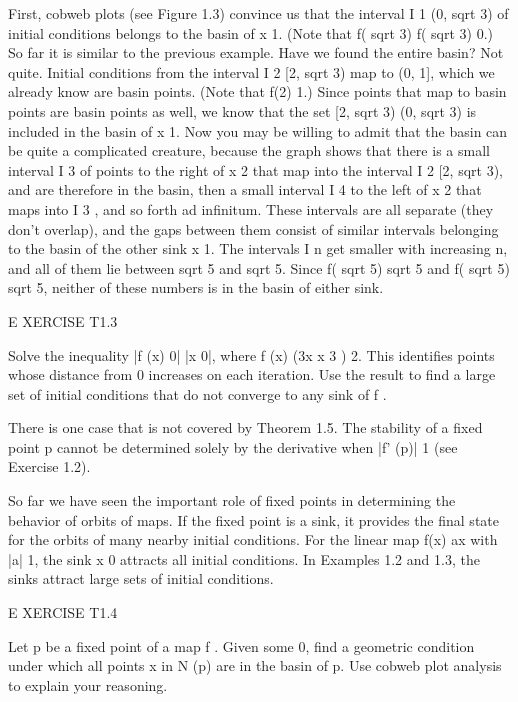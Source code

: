 \documentclass[12pt]{article}
\begin{document}
First, cobweb plots (see Figure 1.3) convince us that the interval I 1  (0, sqrt 3) of initial conditions 
belongs to the basin of x  1. (Note that f( sqrt 3)  f( sqrt 3)  0.) So far it is similar to the previous 
example. Have we found the entire basin? Not quite. Initial conditions from the interval I 2  [2,  sqrt 3) 
map to (0, 1], which we already know are basin points. (Note that f(2)  1.) Since points that map to basin 
points are basin points as well, we know that the set [2,  sqrt 3)  (0, sqrt 3) is included in the basin of x  
1. Now you may be willing to admit that the basin can be quite a complicated creature, because the graph 
shows that there is a small interval I 3 of points to the right of x  2 that map into the interval I 2  [2,  
sqrt 3), and are therefore in the basin, then a small interval I 4 to the left of x  2 that maps into I 3 , 
and so forth ad infinitum. These intervals are all separate (they don’t overlap), and the gaps between them 
consist of similar intervals belonging to the basin of the other sink x  1. The intervals I n get smaller 
with increasing n, and all of them lie between  sqrt 5 and sqrt 5. Since f( sqrt 5)   sqrt 5 and f( sqrt 5)  sqrt 5, 
neither of these numbers is in the basin of either sink.

 

E XERCISE T1.3

Solve the inequality |f (x)  0| 
 |x  0|, where f (x)  (3x  x 3 )  2. This identifies points whose distance from 0 increases on each 
iteration. Use the result to find a large set of initial conditions that do not converge to any sink of f .

There is one case that is not covered by Theorem 1.5. The stability of a fixed point p cannot be determined 
solely by the derivative when |f' (p)|  1 (see Exercise 1.2).


So far we have seen the important role of fixed points in determining the behavior of orbits of maps. If 
the fixed point is a sink, it provides the final state for the orbits of many nearby initial conditions. 
For the linear map f(x)  ax with |a|  1, the sink x  0 attracts all initial conditions. In Examples 1.2 and 
1.3, the sinks attract large sets of initial conditions.

 

E XERCISE T1.4

Let p be a fixed point of a map f . Given some  
 0, find a geometric condition under which all points x in N  (p) are in the basin of p. Use cobweb plot 
analysis to explain your reasoning.
\end{document}
